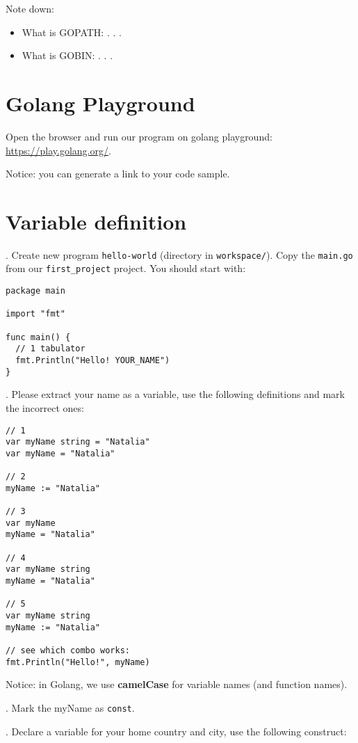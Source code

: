 \documentclass[11pt, letterpaper]{article}
\begin{document}
\bigskip
Note down:
\begin{itemize}
    \item What is GOPATH: . . .
    \item What is GOBIN: . . .
\end{itemize}

\section{Golang Playground}

Open the browser and run our program on golang playground: \href{https://play.golang.org/}{https://play.golang.org/}.

Notice: you can generate a link to your code sample.

\section{Variable definition}
. Create new program \verb|hello-world| (directory in \texttt{workspace/}). Copy the \verb|main.go| from our \verb|first_project| project. You should start with:

\begin{verbatim}
package main

import "fmt"

func main() {
  // 1 tabulator
  fmt.Println("Hello! YOUR_NAME")
}
\end{verbatim}

. Please extract your name as a variable, use the following definitions and mark the incorrect ones:

\begin{verbatim}
// 1
var myName string = "Natalia"
var myName = "Natalia"

// 2
myName := "Natalia"

// 3
var myName
myName = "Natalia"

// 4
var myName string
myName = "Natalia"

// 5
var myName string
myName := "Natalia"

// see which combo works:
fmt.Println("Hello!", myName)
\end{verbatim}

Notice: in Golang, we use \textbf{camelCase} for variable names (and function names).

. Mark the myName as \verb|const|.

. Declare a variable for your home country and city, use the following construct:
\end{document}
